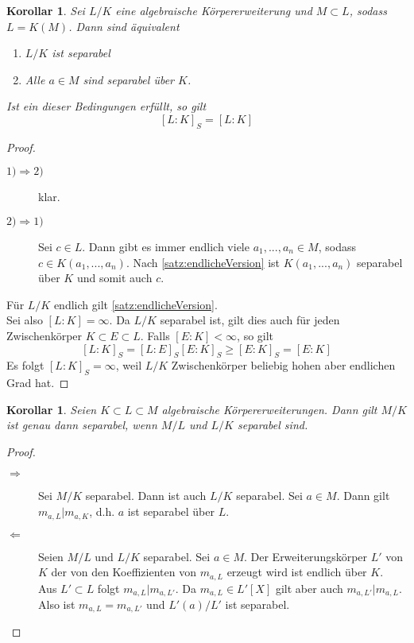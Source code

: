 \documentclass[10pt,a4paper]{article}
\theoremstyle{plain}
\newtheorem{kor}[theorem]{Korollar}
\theoremstyle{definition}
\theoremstyle{remark}
\begin{document}
	\begin{kor}
		Sei $L/K$ eine algebraische Körpererweiterung und $M\subset L$, sodass $L=K(M)$. Dann sind äquivalent
		\begin{enumerate}
			\item $L/K$ ist separabel
			\item Alle $a\in M$ sind separabel über $K$.
		\end{enumerate}
		Ist ein dieser Bedingungen erfüllt, so gilt
		\[[L:K]_S=[L:K]\]
	\end{kor}
	\begin{proof}
		\begin{description}
			\item[$1)\Rightarrow 2)$] klar.
			\item[$2)\Rightarrow 1)$] Sei $c\in L$. Dann gibt es immer endlich viele $a_1,...,a_n\in M$, sodass $c\in K(a_1,...,a_n)$. Nach \ref{satz:endlicheVersion} ist $K(a_1,...,a_n)$ separabel über $K$ und somit auch $c$.
		\end{description}
		Für $L/K$ endlich gilt \ref{satz:endlicheVersion}.\\
		Sei also $[L:K]=\infty$. Da $L/K$ separabel ist, gilt dies auch für jeden Zwischenkörper $K\subset E\subset L$. Falls $[E:K]<\infty$, so gilt
		\[[L:K]_S=[L:E]_S[E:K]_S\geq[E:K]_S=[E:K]\]
		Es folgt $[L:K]_S=\infty$, weil $L/K$ Zwischenkörper beliebig hohen aber endlichen Grad hat. 
	\end{proof}

	\begin{kor}
		Seien $K\subset L\subset M$ algebraische Körpererweiterungen. Dann gilt $M/K$ ist genau dann separabel, wenn $M/L$ und $L/K$ separabel sind.
	\end{kor}
	\begin{proof}
		\begin{description}
			\item[$\Rightarrow$] Sei $M/K$ separabel. Dann ist auch $L/K$ separabel. Sei $a\in M$. Dann gilt $m_{a,L}|m_{a,K}$, d.h. $a$ ist separabel über $L$.
			\item[$\Leftarrow$] Seien $M/L$ und $L/K$ separabel. Sei $a\in M$. Der Erweiterungskörper $L'$ von $K$ der von den Koeffizienten von $m_{a,L}$ erzeugt wird ist endlich über $K$.\\
			Aus $L'\subset L$ folgt $m_{a,L}|m_{a,L'}$. Da $m_{a,L}\in L'[X]$ gilt aber auch $m_{a,L'}|m_{a,L}$. Also ist $m_{a,L}=m_{a,L'}$ und $L'(a)/L'$ ist separabel.
		\end{description}
	\end{proof}
\end{document}
